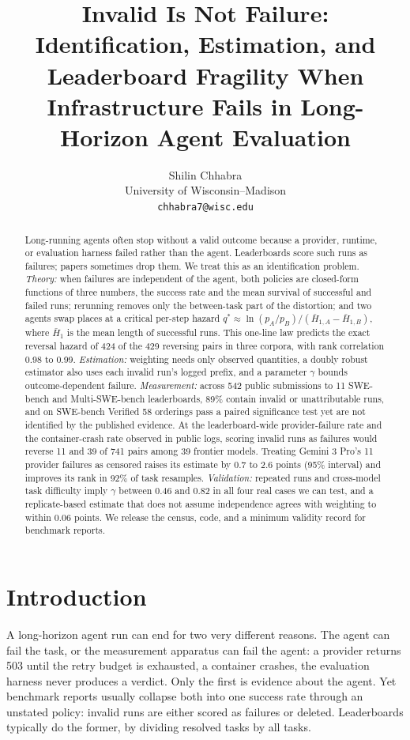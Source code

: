 \documentclass[11pt]{article}
\title{Invalid Is Not Failure:\\[2pt]
\large Identification, Estimation, and Leaderboard Fragility When\\
Infrastructure Fails in Long-Horizon Agent Evaluation}
\author{Shilin Chhabra\\
University of Wisconsin--Madison\\
\texttt{chhabra7@wisc.edu}}
\date{}
\theoremstyle{definition}
\theoremstyle{remark}
\begin{document}
\maketitle

\begin{abstract}
Long-running agents often stop without a valid outcome because a provider,
runtime, or evaluation harness failed rather than the agent. Leaderboards score
such runs as failures; papers sometimes drop them. We treat this as an
identification problem. \emph{Theory:} when failures are independent of the
agent, both policies are closed-form functions of three numbers, the success
rate and the mean survival of successful and failed runs; rerunning removes only
the between-task part of the distortion; and two agents swap places at a
critical per-step hazard $q^*\approx\ln(p_A/p_B)/(\bar H_{1,A}-\bar H_{1,B})$,
where $\bar H_1$ is the mean length of successful runs. This one-line law
predicts the exact reversal hazard of 424 of the 429 reversing pairs in three
corpora, with rank correlation 0.98 to 0.99. \emph{Estimation:} weighting
needs only observed quantities, a doubly robust estimator also uses each invalid
run's logged prefix, and a parameter $\gamma$ bounds outcome-dependent failure.
\emph{Measurement:} across 542 public submissions to 11 SWE-bench and
Multi-SWE-bench leaderboards, 89\% contain invalid or unattributable runs, and
on SWE-bench Verified 58 orderings pass a paired significance test yet are not
identified by the published evidence. At the leaderboard-wide provider-failure
rate and the container-crash rate observed in public logs, scoring invalid runs
as failures would reverse 11 and 39 of 741 pairs among 39 frontier models. Treating Gemini 3 Pro's 11 provider failures as
censored raises its estimate by 0.7 to 2.6 points (95\% interval) and improves
its rank in 92\% of task resamples. \emph{Validation:} repeated runs and
cross-model task difficulty imply $\gamma$ between 0.46 and 0.82 in all four
real cases we can test, and a replicate-based estimate that does not assume
independence agrees with weighting to within 0.06 points. We release the census,
code, and a minimum validity record for benchmark reports.
\end{abstract}

\section{Introduction}

A long-horizon agent run can end for two very different reasons. The agent can
fail the task, or the measurement apparatus can fail the agent: a provider
returns 503 until the retry budget is exhausted, a container crashes, the
evaluation harness never produces a verdict. Only the first is evidence about
the agent. Yet benchmark reports usually collapse both into one success rate
through an unstated policy: invalid runs are either scored as failures or
deleted. Leaderboards typically do the former, by dividing resolved tasks by
all tasks.
\end{document}
